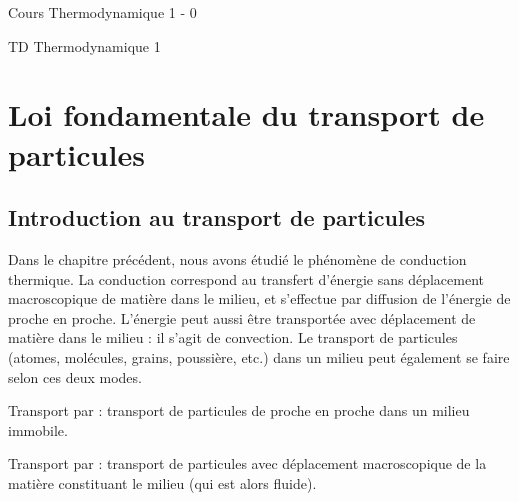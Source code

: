 \documentclass[12pt,fancy]{cours}
\begin{document}
{
  \item Cours Thermodynamique 1 - 0
  \item TD Thermodynamique 1
}


\section{Loi fondamentale du transport de particules}

\subsection{Introduction au transport de particules}


Dans le chapitre précédent, nous avons étudié le phénomène de conduction thermique. La conduction correspond au transfert d’énergie sans déplacement macroscopique de matière dans le milieu, et s’effectue par diffusion de l’énergie de proche en proche. L’énergie peut aussi être transportée avec déplacement de matière dans le milieu : il s’agit de convection. Le transport de particules (atomes, molécules, grains, poussière, etc.) dans un milieu peut également se faire selon ces deux modes.
\begin{liste}
\item Transport par  : transport de particules de proche en proche dans un milieu immobile.
\item Transport par  : transport de particules avec déplacement macroscopique de la matière constituant le milieu (qui est alors fluide).
\end{liste}
\end{document}
